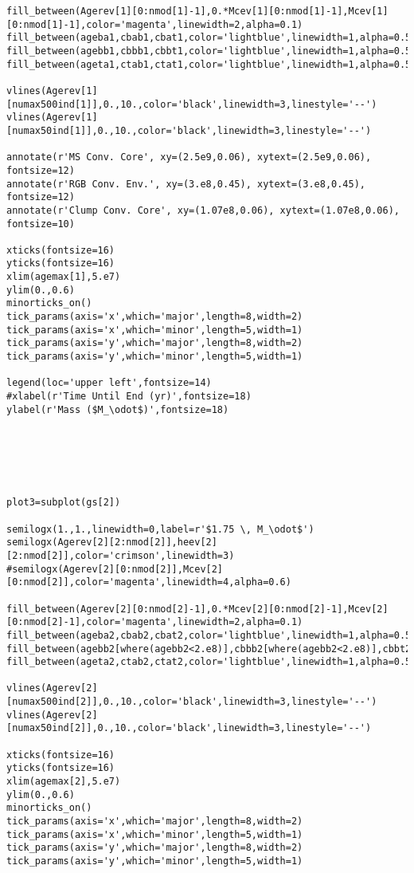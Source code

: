 \begin{verbatim}
fill_between(Agerev[1][0:nmod[1]-1],0.*Mcev[1][0:nmod[1]-1],Mcev[1][0:nmod[1]-1],color='magenta',linewidth=2,alpha=0.1)
fill_between(ageba1,cbab1,cbat1,color='lightblue',linewidth=1,alpha=0.5)
fill_between(agebb1,cbbb1,cbbt1,color='lightblue',linewidth=1,alpha=0.5)
fill_between(ageta1,ctab1,ctat1,color='lightblue',linewidth=1,alpha=0.5)

vlines(Agerev[1][numax500ind[1]],0.,10.,color='black',linewidth=3,linestyle='--')
vlines(Agerev[1][numax50ind[1]],0.,10.,color='black',linewidth=3,linestyle='--')

annotate(r'MS Conv. Core', xy=(2.5e9,0.06), xytext=(2.5e9,0.06), fontsize=12)
annotate(r'RGB Conv. Env.', xy=(3.e8,0.45), xytext=(3.e8,0.45), fontsize=12)
annotate(r'Clump Conv. Core', xy=(1.07e8,0.06), xytext=(1.07e8,0.06), fontsize=10)

xticks(fontsize=16)
yticks(fontsize=16)
xlim(agemax[1],5.e7)
ylim(0.,0.6)
minorticks_on()
tick_params(axis='x',which='major',length=8,width=2)
tick_params(axis='x',which='minor',length=5,width=1)
tick_params(axis='y',which='major',length=8,width=2)
tick_params(axis='y',which='minor',length=5,width=1)

legend(loc='upper left',fontsize=14)
#xlabel(r'Time Until End (yr)',fontsize=18)
ylabel(r'Mass ($M_\odot$)',fontsize=18)






plot3=subplot(gs[2])

semilogx(1.,1.,linewidth=0,label=r'$1.75 \, M_\odot$')
semilogx(Agerev[2][2:nmod[2]],heev[2][2:nmod[2]],color='crimson',linewidth=3)
#semilogx(Agerev[2][0:nmod[2]],Mcev[2][0:nmod[2]],color='magenta',linewidth=4,alpha=0.6)

fill_between(Agerev[2][0:nmod[2]-1],0.*Mcev[2][0:nmod[2]-1],Mcev[2][0:nmod[2]-1],color='magenta',linewidth=2,alpha=0.1)
fill_between(ageba2,cbab2,cbat2,color='lightblue',linewidth=1,alpha=0.5)
fill_between(agebb2[where(agebb2<2.e8)],cbbb2[where(agebb2<2.e8)],cbbt2[where(agebb2<2.e8)],color='lightblue',linewidth=1,alpha=0.5)
fill_between(ageta2,ctab2,ctat2,color='lightblue',linewidth=1,alpha=0.5)

vlines(Agerev[2][numax500ind[2]],0.,10.,color='black',linewidth=3,linestyle='--')
vlines(Agerev[2][numax50ind[2]],0.,10.,color='black',linewidth=3,linestyle='--')

xticks(fontsize=16)
yticks(fontsize=16)
xlim(agemax[2],5.e7)
ylim(0.,0.6)
minorticks_on()
tick_params(axis='x',which='major',length=8,width=2)
tick_params(axis='x',which='minor',length=5,width=1)
tick_params(axis='y',which='major',length=8,width=2)
tick_params(axis='y',which='minor',length=5,width=1)


\end{verbatim}
